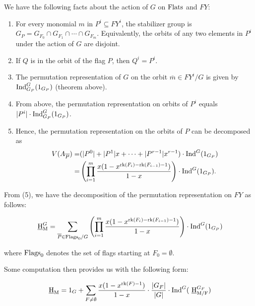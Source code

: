 \documentclass[11pt]{article}
\newcommand{\ind}{\text{\normalfont Ind}}
\newcommand{\hilbM}{\normalfont\text{ \underline{H}}_\text{M}}
\newcommand{\rank}{\normalfont\text{rk}}
\newcommand{\flats}{\normalfont\text{Flats}}
\newcommand{\flags}{\normalfont\text{Flags}}
\newcommand{\hilbMmodF}{\normalfont\text{ \underline{H}}_\text{M/F}}
\theoremstyle{remark}
\begin{document}
We have the following facts about the action of $G$ on $\flats$ and $FY$:
\begin{enumerate}
    \item For every monomial $m$ in $P^i\subseteq FY^i$, the stabilizer group is $G_P=
        G_{F_0}\cap G_{F_1}\cap \cdots\cap G_{F_m}$.
        Equivalently, the orbits of any two elements in $P^i$ under the action of $G$ are disjoint.
    \item If $Q$ is in the orbit of the flag $P$, then $Q^i = P^i$.
    \item The permutation representation of $G$ on the orbit $\overline{m}\in FY^i/G$ is
        given by $\ind_{G_P}^G(1_{G_P})$ (theorem above).
    \item From above, the permutation representation on orbits of $P^i$ equals $|P^i|\cdot\ind_{G_P}^G(1_{G_P})$.
    \item Hence, the permutation representation on the orbits of $P$ can be decomposed as
        \begin{align*}
            V(A_{\overline{P}}) =& (|P^0|+|P^1|x+\cdots+|P^{r-1}|x^{r-1})\cdot\ind^G(1_{G_P})\\
            =&\left(\prod_{i=1}^m{
                \frac{x(1-x^{\rank(F_i)-\rank(F_{i-1})-1})}{1-x}}\right)\cdot\ind^G(1_{G_P}).
        \end{align*}
\end{enumerate}

From (5), we have the decomposition of the permutation representation on $FY$ as follows:

$$\hilbM^G = \sum_{\overline{P}\in\flags_0/G}\left(\prod_{i=1}^m{
    \frac{x(1-x^{\rank(F_i)-\rank(F_{i-1})-1})}{1-x}}\right)\cdot\ind^G(1_{G_P})$$
    
where $\flags_0$ denotes the set of flags starting at $F_0=\emptyset$.

\hrulefill

Some computation then provides us with the following form:

$$\hilbM = 1_G + \sum_{F\neq \emptyset}{\frac{x(1-x^{\rank(F)-1})}{1-x}\cdot
\frac{|G_F|}{|G|}\cdot \ind^G(\hilbMmodF^{G_F})}$$

\hrulefill
\newpage
\printbibliography
\end{document}
